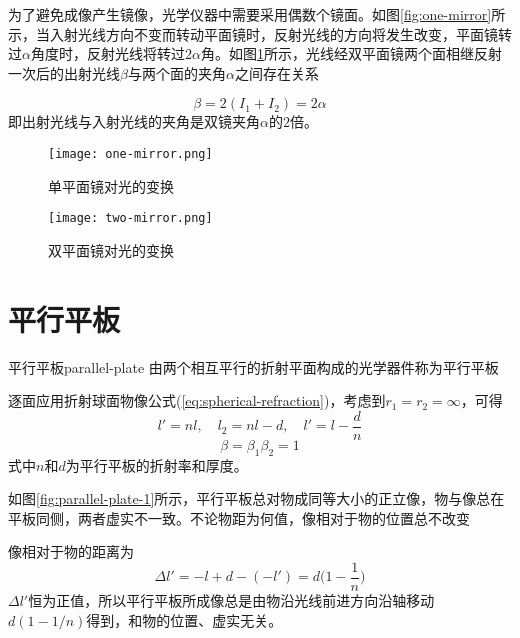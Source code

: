 \documentclass[cn,11pt]{elegantbook}
\begin{document}
为了避免成像产生镜像，光学仪器中需要采用偶数个镜面。如图\ref{fig:one-mirror}所示，当入射光线方向不变而转动平面镜时，反射光线的方向将发生改变，平面镜转过$\alpha$角度时，反射光线将转过$2\alpha$角。如图\ref{fig:two-mirror}所示，光线经双平面镜两个面相继反射一次后的出射光线$\beta$与两个面的夹角$\alpha$之间存在关系

\begin{equation}
\beta=2(I_1+I_2)=2\alpha
\end{equation}
即出射光线与入射光线的夹角是双镜夹角$\alpha$的$2$倍。

\begin{figure}[htbp]
	\begin{minipage}[t]{0.48\textwidth}
		\centering
		\texttt{[image: one-mirror.png]}
		\caption{单平面镜对光的变换}
		\label{fig:one-mirror}
	\end{minipage}
	\qquad
	\begin{minipage}[t]{0.45\textwidth}
		\centering
		\texttt{[image: two-mirror.png]}
		\caption{双平面镜对光的变换}
		\label{fig:two-mirror}
	\end{minipage}
\end{figure}

\section{平行平板}
\label{sect:parallel-plate}

\begin{definition}{平行平板}{parallel-plate}
	由两个相互平行的折射平面构成的光学器件称为平行平板
\end{definition}

逐面应用折射球面物像公式(\ref{eq:spherical-refraction})，考虑到$r_1=r_2=\infty$，可得
\begin{equation}
l'=nl,\quad l_2=nl-d,\quad l'=l-\frac{d}{n}
\end{equation}
\begin{equation}
\beta=\beta_1\beta_2=1
\end{equation}
式中$n$和$d$为平行平板的折射率和厚度。
\begin{property}
如图\ref{fig:parallel-plate-1}所示，平行平板总对物成同等大小的正立像，物与像总在平板同侧，两者虚实不一致。不论物距为何值，像相对于物的位置总不改变
\end{property}

像相对于物的距离为
\begin{equation}
\Delta l'=-l+d-(-l')=d\bigg(1-\frac{1}{n}\bigg)
\end{equation}
$\Delta l'$恒为正值，所以平行平板所成像总是由物沿光线前进方向沿轴移动$d(1-1/n)$得到，和物的位置、虚实无关。
\end{document}
